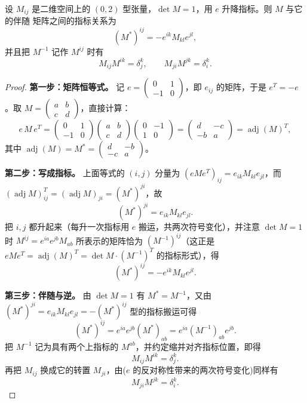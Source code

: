 \begin{lemma}\label{lem:adj}
设 $M_{ij}$ 是二维空间上的 $(0,2)$ 型张量，$\det M=1$，用 $e$ 升降指标。则 $M$ 与它的伴随
矩阵之间的指标关系为
\[
(M^*)^{ij}=-e^{ik}M_{kl}e^{jl},
\]
并且把 $M^{-1}$ 记作 $M^{ij}$ 时有
\[
M_{ij}M^{ik}=\delta^k_j,\qquad M_{ji}M^{jk}=\delta^k_i .
\]
\end{lemma}

\begin{proof}
\textbf{第一步：矩阵恒等式。}
记 $e=\begin{pmatrix}0&1\\-1&0\end{pmatrix}$，即 $e_{ij}$ 的矩阵，于是 $e^{T}=-e$。取
$M=\begin{pmatrix}a&b\\c&d\end{pmatrix}$，直接计算：
\[
e\,M\,e^{T}
=\begin{pmatrix}0&1\\-1&0\end{pmatrix}\begin{pmatrix}a&b\\c&d\end{pmatrix}
\begin{pmatrix}0&-1\\1&0\end{pmatrix}
=\begin{pmatrix}d&-c\\-b&a\end{pmatrix}
=\operatorname{adj}(M)^{T},
\]
其中 $\operatorname{adj}(M)=M^*=\begin{pmatrix}d&-b\\-c&a\end{pmatrix}$。

\textbf{第二步：写成指标。}
上面等式的 $(i,j)$ 分量为 $(eMe^{T})_{ij}=e_{ik}M_{kl}e_{jl}$，而
$(\operatorname{adj}M)^T_{ij}=(\operatorname{adj}M)_{ji}=(M^*)^{ji}$，故
\[
(M^*)^{ji}=e_{ik}M_{kl}e_{jl}.
\]
把 $i,j$ 都升起来（每升一次指标用 $e$ 搬运，共两次符号变化），并注意 $\det M=1$ 时
$M^{ij}=e^{ia}e^{jb}M_{ab}$ 所表示的矩阵恰为 $(M^{-1})^{ij}$（这正是 $eMe^{T}=\operatorname{adj}(M)^T
=\det M\cdot(M^{-1})^{T}$ 的指标形式），得
\[
(M^*)^{ij}=-e^{ik}M_{kl}e^{jl}.
\]

\textbf{第三步：伴随与逆。}
由 $\det M=1$ 有 $M^*=M^{-1}$，又由 $(M^*)^{ji}=e_{ik}M_{kl}e_{jl}=-(M^*)^{ij}$ 型的指标搬运可得
\[
(M^*)^{ij}=e^{ia}e^{jb}(M^*)_{ab}=e^{ia}(M^{-1})_{ab}e^{jb} .
\]
把 $M^{-1}$ 记为具有两个上指标的 $M^{ab}$，并约定缩并对齐指标位置，即得
\[
M_{ij}M^{ik}=\delta^k_j .
\]
再把 $M_{ij}$ 换成它的转置 $M_{ji}$，由($e$ 的反对称性带来的两次符号变化)同样有
\[
M_{ji}M^{jk}=\delta^k_i .
\]
\end{proof}

